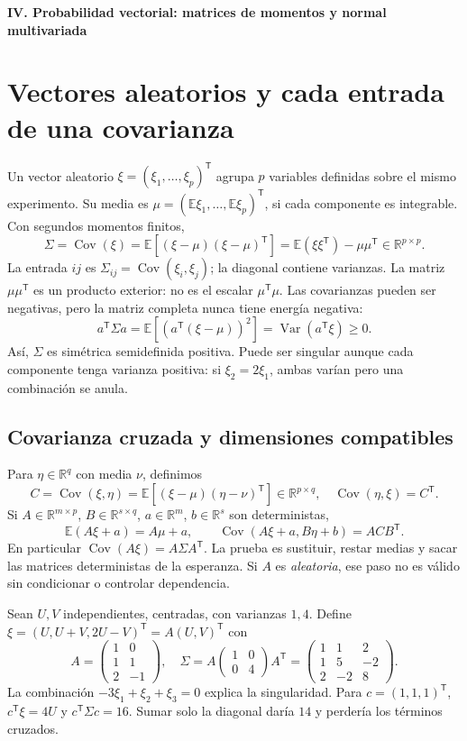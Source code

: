 \documentclass[11pt,a4paper]{article}
\newcommand{\R}{\mathbb R}
\newcommand{\E}{\mathbb E}
\newcommand{\T}{^{\mathsf T}}
\DeclareMathOperator{\Var}{Var}
\DeclareMathOperator{\Cov}{Cov}
\theoremstyle{definition}
\newcommand{\parte}[1]{\par\bigskip\Needspace{8\baselineskip}\begin{center}{\Large\bfseries\color{azul}#1}\end{center}}
\begin{document}
\parte{IV. Probabilidad vectorial: matrices de momentos y normal multivariada}
\section{Vectores aleatorios y cada entrada de una covarianza}
Un vector aleatorio $\xi=(\xi_1,\ldots,\xi_p)\T$ agrupa $p$ variables definidas sobre el mismo experimento. Su media es $\mu=(\E\xi_1,\ldots,\E\xi_p)\T$, si cada componente es integrable. Con segundos momentos finitos,
\[
\Sigma=\Cov(\xi)=\E[(\xi-\mu)(\xi-\mu)\T]
=\E(\xi\xi\T)-\mu\mu\T\in\R^{p\times p}.
\]
La entrada $ij$ es $\Sigma_{ij}=\Cov(\xi_i,\xi_j)$; la diagonal contiene varianzas. La matriz $\mu\mu\T$ es un producto exterior: no es el escalar $\mu\T\mu$. Las covarianzas pueden ser negativas, pero la matriz completa nunca tiene energía negativa:
\[
a\T\Sigma a=\E[(a\T(\xi-\mu))^2]=\Var(a\T\xi)\ge0.
\]
Así, $\Sigma$ es simétrica semidefinida positiva. Puede ser singular aunque cada componente tenga varianza positiva: si $\xi_2=2\xi_1$, ambas varían pero una combinación se anula.
\subsection{Covarianza cruzada y dimensiones compatibles}
Para $\eta\in\R^q$ con media $\nu$, definimos
\[
C=\Cov(\xi,\eta)=\E[(\xi-\mu)(\eta-\nu)\T]\in\R^{p\times q},
\quad\Cov(\eta,\xi)=C\T.
\]
Si $A\in\R^{m\times p}$, $B\in\R^{s\times q}$, $a\in\R^m$, $b\in\R^s$ son deterministas,
\[
\E(A\xi+a)=A\mu+a,\qquad
\Cov(A\xi+a,B\eta+b)=ACB\T.
\]
En particular $\Cov(A\xi)=A\Sigma A\T$. La prueba es sustituir, restar medias y sacar las matrices deterministas de la esperanza. Si $A$ es \emph{aleatoria}, ese paso no es válido sin condicionar o controlar dependencia.
\begin{ejemplo}
Sean $U,V$ independientes, centradas, con varianzas $1,4$. Define $\xi=(U,U+V,2U-V)\T=A(U,V)\T$ con
\[
A=\begin{pmatrix}1&0\\1&1\\2&-1\end{pmatrix},\quad
\Sigma=A\begin{pmatrix}1&0\\0&4\end{pmatrix}A\T
=\begin{pmatrix}1&1&2\\1&5&-2\\2&-2&8\end{pmatrix}.
\]
La combinación $-3\xi_1+\xi_2+\xi_3=0$ explica la singularidad. Para $c=(1,1,1)\T$, $c\T\xi=4U$ y $c\T\Sigma c=16$. Sumar solo la diagonal daría $14$ y perdería los términos cruzados.
\end{ejemplo}
\end{document}
